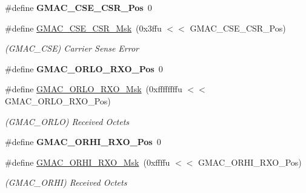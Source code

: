 \begin{DoxyCompactItemize}
\mbox{\label{group__SAMV71__GMAC_gadc5b52a2b13a639d7ef949cf9239ef16}} 
\#define {\bfseries G\+M\+A\+C\+\_\+\+C\+S\+E\+\_\+\+C\+S\+R\+\_\+\+Pos}~0
\item 
\mbox{\label{group__SAMV71__GMAC_gaa95a700350a1dc7761ce9e01afbfb743}} 
\#define \mbox{\hyperlink{group__SAMV71__GMAC_gaa95a700350a1dc7761ce9e01afbfb743}{G\+M\+A\+C\+\_\+\+C\+S\+E\+\_\+\+C\+S\+R\+\_\+\+Msk}}~(0x3ffu $<$$<$ G\+M\+A\+C\+\_\+\+C\+S\+E\+\_\+\+C\+S\+R\+\_\+\+Pos)
\begin{DoxyCompactList}\small\item\em (G\+M\+A\+C\+\_\+\+C\+SE) Carrier Sense Error \end{DoxyCompactList}\item 
\mbox{\label{group__SAMV71__GMAC_ga7062fe3183f518c86bf2370bd9381c6a}} 
\#define {\bfseries G\+M\+A\+C\+\_\+\+O\+R\+L\+O\+\_\+\+R\+X\+O\+\_\+\+Pos}~0
\item 
\mbox{\label{group__SAMV71__GMAC_gad70ad91385d78bc5589c3255d6032ef3}} 
\#define \mbox{\hyperlink{group__SAMV71__GMAC_gad70ad91385d78bc5589c3255d6032ef3}{G\+M\+A\+C\+\_\+\+O\+R\+L\+O\+\_\+\+R\+X\+O\+\_\+\+Msk}}~(0xffffffffu $<$$<$ G\+M\+A\+C\+\_\+\+O\+R\+L\+O\+\_\+\+R\+X\+O\+\_\+\+Pos)
\begin{DoxyCompactList}\small\item\em (G\+M\+A\+C\+\_\+\+O\+R\+LO) Received Octets \end{DoxyCompactList}\item 
\mbox{\label{group__SAMV71__GMAC_gae9e8bcf4f97ba8f01c881b256d9f4924}} 
\#define {\bfseries G\+M\+A\+C\+\_\+\+O\+R\+H\+I\+\_\+\+R\+X\+O\+\_\+\+Pos}~0
\item 
\mbox{\label{group__SAMV71__GMAC_gaf95253884b3483ac7db5ddb45e6a73f4}} 
\#define \mbox{\hyperlink{group__SAMV71__GMAC_gaf95253884b3483ac7db5ddb45e6a73f4}{G\+M\+A\+C\+\_\+\+O\+R\+H\+I\+\_\+\+R\+X\+O\+\_\+\+Msk}}~(0xffffu $<$$<$ G\+M\+A\+C\+\_\+\+O\+R\+H\+I\+\_\+\+R\+X\+O\+\_\+\+Pos)
\begin{DoxyCompactList}\small\item\em (G\+M\+A\+C\+\_\+\+O\+R\+HI) Received Octets \end{DoxyCompactList}\item 
$$
\end{DoxyCompactItemize}
